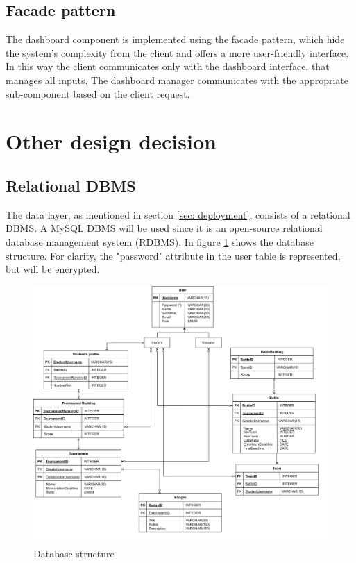 \subsection*{Facade pattern}
The dashboard component is implemented using the facade pattern, which hide the system's complexity from the client and offers a more user-friendly interface.
In this way the client communicates only with the dashboard interface, that manages all inputs. The dashboard manager communicates with the appropriate sub-component based on the client request.

\section{Other design decision}
\subsection*{Relational DBMS}
The data layer, as mentioned in section \ref{sec: deployment}, consists of a relational DBMS. A MySQL DBMS will be used since it is an open-source relational database management system (RDBMS). \newline
In figure \ref{fig:DB} shows the database structure. \newline
For clarity, the "password" attribute in the user table is represented, but will be encrypted.

\begin{figure}[h]
    \centering 
    \includegraphics[width=\textwidth]{images/DB.png}
    \caption{Database structure}
    \label{fig:DB}
\end{figure}
